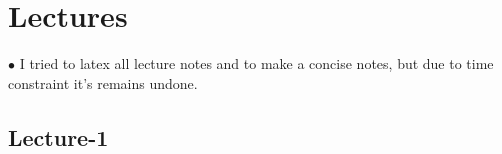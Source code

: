 \documentclass[lec]{subfiles}
\begin{document}
\chapter*{Lectures} %
\setcounter{chapter}{1} %


\begin{center}
  \large $\bullet$ I tried to latex all lecture notes and to make a concise notes, but due to time constraint it's remains undone.
\end{center}

\section{Lecture-1}
\end{document}
